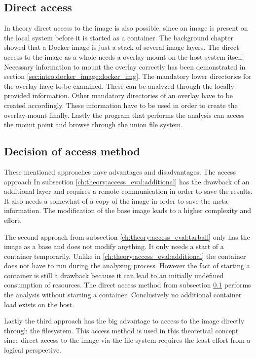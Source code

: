 \subsection{Direct access} 
\label{ch:theory:access_eval:direct_access}
In theory direct access to the image is also possible, since an image is present on the local system before it is started as a container.
The background chapter showed that a Docker image is just a stack of several image layers. 
The direct access to the image as a whole needs a overlay-mount on the host system itself.
Necessary information to mount the overlay correctly has been demonstrated in section \ref{sec:intro:docker_image:docker_img}.
The mandatory lower directories for the overlay have to be examined. 
These can be analyzed through the locally provided information.
Other mandatory directories of an overlay have to be created accordingly.
These information have to be used in order to create the overlay-mount finally. 
Lastly the program that performs the analysis can access the mount point and browse through the union file system.

\subsection{Decision of access method} 
\label{ch:theory:access_eval:decision_access}
These mentioned approaches have advantages and disadvantages. 	
The access approach In subsection \ref{ch:theory:access_eval:additional} has the drawback of an additional layer and requires a remote communication in order to save the results.
It also needs a somewhat of a copy of the image in order to save the meta-information. 
The modification of the base image leads to a higher complexity and effort. 

The second approach from subsection \ref{ch:theory:access_eval:tarball} only has the image as a base and does not modify anything. 
It only needs a start of a container temporarily. 
Unlike in \ref{ch:theory:access_eval:additional} the container does not have to run during the analyzing process. 
However the fact of starting a container is still a drawback because it can lead to an initially undefined consumption of resources.
The direct access method from subsection \ref{ch:theory:access_eval:direct_access} performs the analysis without starting a container. 
Conclusively no additional container load exists on the host.

Lastly the third approach has the big advantage to access to the image directly through the filesystem. 
This access method is used in this theoretical concept since direct access to the image via the file system requires the least effort from a logical perspective.